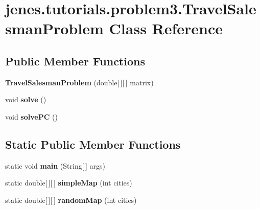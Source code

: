 \hypertarget{classjenes_1_1tutorials_1_1problem3_1_1_travel_salesman_problem}{
\section{jenes.tutorials.problem3.TravelSalesmanProblem Class Reference}
\label{classjenes_1_1tutorials_1_1problem3_1_1_travel_salesman_problem}
}
\subsection*{Public Member Functions}
\begin{CompactItemize}
\item 
\hypertarget{classjenes_1_1tutorials_1_1problem3_1_1_travel_salesman_problem_6a5b57b4c96b1cd6367be99ff5542b0d}{
\textbf{TravelSalesmanProblem} (double\mbox{[}$\,$\mbox{]}\mbox{[}$\,$\mbox{]} matrix)}
\label{classjenes_1_1tutorials_1_1problem3_1_1_travel_salesman_problem_6a5b57b4c96b1cd6367be99ff5542b0d}

\item 
\hypertarget{classjenes_1_1tutorials_1_1problem3_1_1_travel_salesman_problem_c2507cd4e4fecd4a68fa76dee8ee40e1}{
void \textbf{solve} ()}
\label{classjenes_1_1tutorials_1_1problem3_1_1_travel_salesman_problem_c2507cd4e4fecd4a68fa76dee8ee40e1}

\item 
\hypertarget{classjenes_1_1tutorials_1_1problem3_1_1_travel_salesman_problem_6f115876612aecf1c22058ebc96f21d8}{
void \textbf{solvePC} ()}
\label{classjenes_1_1tutorials_1_1problem3_1_1_travel_salesman_problem_6f115876612aecf1c22058ebc96f21d8}

\end{CompactItemize}
\subsection*{Static Public Member Functions}
\begin{CompactItemize}
\item 
\hypertarget{classjenes_1_1tutorials_1_1problem3_1_1_travel_salesman_problem_2ca005fbeba6c5fdf1406aed8ebd6b56}{
static void \textbf{main} (String\mbox{[}$\,$\mbox{]} args)}
\label{classjenes_1_1tutorials_1_1problem3_1_1_travel_salesman_problem_2ca005fbeba6c5fdf1406aed8ebd6b56}

\item 
\hypertarget{classjenes_1_1tutorials_1_1problem3_1_1_travel_salesman_problem_5101bfe709c445cb0dacc93024979082}{
static double\mbox{[}$\,$\mbox{]}\mbox{[}$\,$\mbox{]} \textbf{simpleMap} (int cities)}
\label{classjenes_1_1tutorials_1_1problem3_1_1_travel_salesman_problem_5101bfe709c445cb0dacc93024979082}

\item 
\hypertarget{classjenes_1_1tutorials_1_1problem3_1_1_travel_salesman_problem_aac8cbd0414b02891c9572b3e07c2637}{
static double\mbox{[}$\,$\mbox{]}\mbox{[}$\,$\mbox{]} \textbf{randomMap} (int cities)}
\label{classjenes_1_1tutorials_1_1problem3_1_1_travel_salesman_problem_aac8cbd0414b02891c9572b3e07c2637}

\end{CompactItemize}
